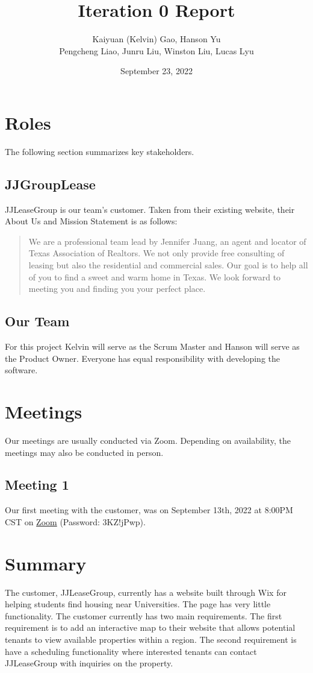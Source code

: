\documentclass{article}
\title{Iteration 0 Report}
\author{Kaiyuan (Kelvin) Gao, Hanson Yu\\ Pengcheng Liao, Junru Liu, Winston Liu, Lucas Lyu}
\date{September 23, 2022}
\begin{document}
\maketitle
\tableofcontents
\pagebreak

\section{Roles}
The following section summarizes key stakeholders.

\subsection{JJGroupLease}
JJLeaseGroup is our team's customer. Taken from their existing website, their About Us and Mission Statement is as follows:
\begin{quote}
We are a professional team lead by Jennifer Juang, an agent and locator of Texas Association of Realtors. We not only provide free consulting of leasing but also the residential and commercial sales. Our goal is to help all of you to find a sweet and warm home in Texas. We look forward to meeting you and finding you your perfect place.
\end{quote}

\subsection{Our Team}
For this project Kelvin will serve as the Scrum Master and Hanson will serve as the Product Owner. Everyone has equal responsibility with developing the software.

\section{Meetings}
Our meetings are usually conducted via Zoom. Depending on availability, the meetings may also be conducted in person.

\subsection{Meeting 1}
Our first meeting with the customer, was on September 13th, 2022 at 8:00PM CST on \href{https://tamu.zoom.us/rec/share/kEgygyjCLgkbudjWJ6mxFOQvCbwMZURmFh5FwdnvB8K65vDr9X2wrg7qcIK0lOGj.kSFXOVHrF6uZ0hzF?startTime=1663117169000}{Zoom} (Password: 3KZ!jPwp).

\pagebreak

\section{Summary}
The customer, JJLeaseGroup, currently has a website built through Wix for helping students find housing near Universities. The page has very little functionality. The customer currently has two main requirements. The first requirement is to add an interactive map to their website that allows potential tenants to view available properties within a region. The second requirement is have a scheduling functionality where interested tenants can contact JJLeaseGroup with inquiries on the property.\\
\end{document}
